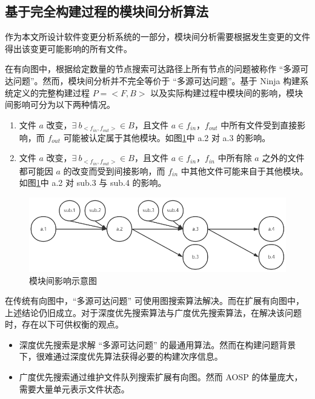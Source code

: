 \subsection{基于完全构建过程的模块间分析算法}

作为本文所设计软件变更分析系统的一部分，模块间分析需要根据发生变更的文件得出该变更可能影响的所有文件。

在有向图中，根据给定数量的节点搜索可达路径上所有节点的问题被称作 “多源可达问题”。然而，模块间分析并不完全等价于 “多源可达问题”。基于 Ninja 构建系统定义的完整构建过程 $P = <F, B>$ 以及实际构建过程中模块间的影响，模块间影响可分为以下两种情况。

\begin{enumerate}
    \item 文件 $a$ 改变，$\exists\ b_{<f_{in}, f_{out}>} \in B$，且文件 $a \in f_{in}$，$f_{out}$ 中所有文件受到直接影响，而 $f_{out}$ 可能被认定属于其他模块。如图\ref{fig:inter-module}中 a.2 对 a.3 的影响。
    \item 文件 $a$ 改变，$\exists\ b_{<f_{in}, f_{out}>} \in B$，且文件 $a \in f_{in}$，$f_{in}$ 中所有除 $a$ 之外的文件都可能因 $a$ 的改变而受到间接影响，而 $f_{in}$ 中其他文件可能来自于其他模块。如图\ref{fig:inter-module}中 a.2 对 sub.3 与 sub.4 的影响。
\end{enumerate}

\begin{figure}[htb]
    \centering
    \includegraphics[width=.8\textwidth]{figures/inter-module.png}
    \caption{模块间影响示意图}
    \label{fig:inter-module}
\end{figure}

在传统有向图中，“多源可达问题” 可使用图搜索算法解决。而在扩展有向图中，上述结论仍旧成立。对于深度优先搜索算法与广度优先搜索算法，在解决该问题时，存在以下可供权衡的观点。

\begin{itemize}
    \item 深度优先搜索是求解 “多源可达问题” 的最通用算法。然而在构建问题背景下，很难通过深度优先算法获得必要的构建次序信息。
    \item 广度优先搜索通过维护文件队列搜索扩展有向图。然而 AOSP 的体量庞大，需要大量单元表示文件状态。
\end{itemize}

